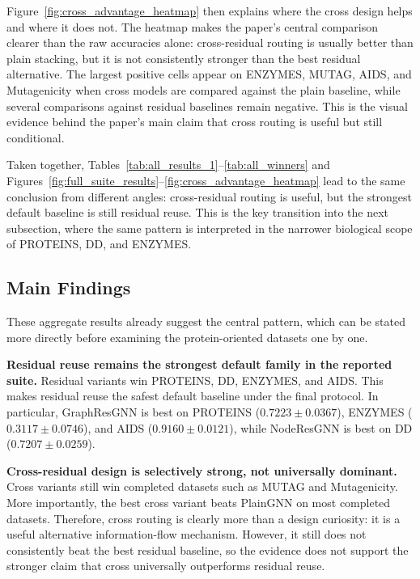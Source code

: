Figure~\ref{fig:cross_advantage_heatmap} then explains where the cross design helps and where it does not. The heatmap makes the paper's central comparison clearer than the raw accuracies alone: cross-residual routing is usually better than plain stacking, but it is not consistently stronger than the best residual alternative. The largest positive cells appear on ENZYMES, MUTAG, AIDS, and Mutagenicity when cross models are compared against the plain baseline, while several comparisons against residual baselines remain negative. This is the visual evidence behind the paper's main claim that cross routing is useful but still conditional.

Taken together, Tables~\ref{tab:all_results_1}--\ref{tab:all_winners} and Figures~\ref{fig:full_suite_results}--\ref{fig:cross_advantage_heatmap} lead to the same conclusion from different angles: cross-residual routing is useful, but the strongest default baseline is still residual reuse. This is the key transition into the next subsection, where the same pattern is interpreted in the narrower biological scope of PROTEINS, DD, and ENZYMES.
\FloatBarrier

\subsection{Main Findings}

These aggregate results already suggest the central pattern, which can be stated more directly before examining the protein-oriented datasets one by one.

\textbf{Residual reuse remains the strongest default family in the reported suite.} Residual variants win PROTEINS, DD, ENZYMES, and AIDS. This makes residual reuse the safest default baseline under the final protocol. In particular, GraphResGNN is best on PROTEINS ($0.7223 \pm 0.0367$), ENZYMES ($0.3117 \pm 0.0746$), and AIDS ($0.9160 \pm 0.0121$), while NodeResGNN is best on DD ($0.7207 \pm 0.0259$).

\textbf{Cross-residual design is selectively strong, not universally dominant.} Cross variants still win completed datasets such as MUTAG and Mutagenicity. More importantly, the best cross variant beats PlainGNN on most completed datasets. Therefore, cross routing is clearly more than a design curiosity: it is a useful alternative information-flow mechanism. However, it still does not consistently beat the best residual baseline, so the evidence does not support the stronger claim that cross universally outperforms residual reuse.

